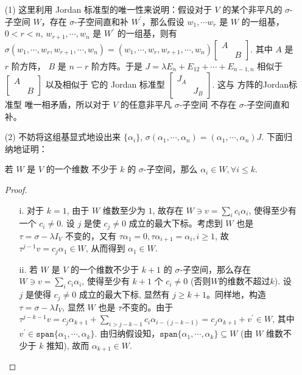 \documentclass{article}
\begin{document}
\begin{spacing}{1.5}
\begin{itemize}
    \begin{itemize}
        \item [(1)] 这里利用 Jordan 标准型的唯一性来说明：假设对于 $V$ 的某个非平凡的 $\sigma$-子空间 $W$，存在 $\sigma$-子空间直和补 $W^\prime$，那么假设 $w_1, \cdots w_r$ 是 $W$ 的一组基，$0<r<n$, $w_{r+1}, \cdots, w_n$ 是 $W^\prime$ 的一组基，则有 $\sigma (w_1, \cdots, w_r, w_{r+1},\cdots, w_n) = (w_1, \cdots, w_r, w_{r+1},\cdots, w_n)\left[\begin{array}{cc}A&\\&B\end{array}\right]$. 其中 $A$ 是 $r$ 阶方阵， $B$ 是 $n-r$ 阶方阵。于是 $J = \lambda E_n + E_{12} + \cdots + E_{n-1,n}$ 相似于 $\left[\begin{array}{cc}A&\\&B\end{array}\right]$ 以及相似于 它的 Jordan 标准型 $\left[\begin{array}{cc}J_A&\\&J_B\end{array}\right]$. 这与 方阵的Jordan标准型 唯一相矛盾，所以对于 $V$ 的任意非平凡 $\sigma$-子空间 不存在 $\sigma$-子空间直和补。
        \item [(2)] 不妨将这组基显式地设出来 $\{\alpha_i\}$, $\sigma(\alpha_1, \cdots, \alpha_n) = (\alpha_1,\cdots,\alpha_n) J$. 下面归纳地证明：
        
        若 $W$ 是 $V$ 的一个维数 不少于 $k$ 的 $\sigma$-子空间，那么 $\alpha_i \in W, \forall i\leq k$.

        \begin{proof}
            ~\\
            \begin{itemize}
                \item [i.] 对于 $k=1$, 由于 $W$ 维数至少为 $1$, 故存在 $W \ni v = \sum_i c_i \alpha_i$, 使得至少有一个 $c_i\ne 0$. 设 $j$ 是使 $c_j\ne 0$ 成立的最大下标。考虑到 $W$ 也是 $\tau = \sigma - \lambda I_V$ 不变的，又有 $\tau \alpha_1 = 0, \tau \alpha_{i+1} = \alpha_i, i\geq 1$, 故 $\tau^{j-1} v = c_j\alpha_1 \in W$, 从而得到 $\alpha_1 \in W$.
                \item [ii.] 若 $W$ 是 $V$ 的一个维数不少于 $k+1$ 的 $\sigma$-子空间，那么存在 $W\ni v = \sum_i c_i\alpha_i$, 使得至少有 $k+1$ 个 $c_i\ne 0$ (否则$W$的维数不超过$k$). 设 $j$ 是使得 $c_j\ne 0$ 成立的最大下标, 显然有 $j\geq k+1$。同样地，构造 $\tau = \sigma - \lambda I_V$, 显然 $W$ 也是 $\tau$不变的。由于 $\tau^{j-k-1} v = c_j \alpha_{k+1} + \sum_{i > j - k - 1} c_i\alpha_{i - (j - k - 1)} = c_j\alpha_{k+1} + v^\prime\in W$, 其中 $v^\prime \in \mathtt{span}\{\alpha_1,\cdots, \alpha_k\}$. 由归纳假设知，$\mathtt{span}\{\alpha_1,\cdots, \alpha_k\} \subseteq W$ (由 $W$ 维数不少于 $k$ 推知), 故而 $\alpha_{k+1}\in W$.
            \end{itemize}
        \end{proof}


\end{itemize}
\end{itemize}
\end{spacing}
\end{document}
